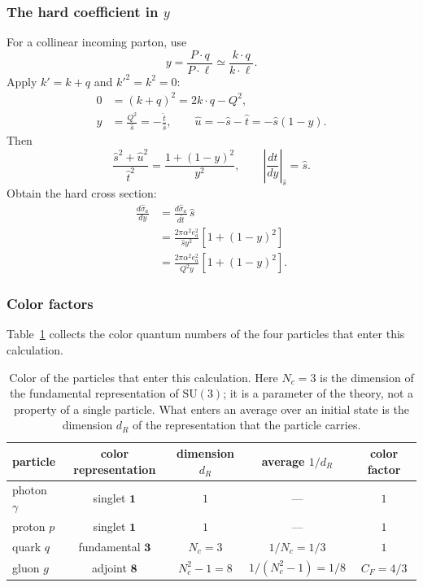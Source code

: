 \documentclass[14pt,a4paper]{extarticle}
\numberwithin{equation}{section}
\begin{document}
\subsubsection{The hard coefficient in \texorpdfstring{$y$}{y}}
For a collinear incoming parton, use
\begin{equation}
 y=\frac{P\cdot q}{P\cdot\ell}
 \simeq\frac{k\cdot q}{k\cdot\ell}.
\end{equation}
Apply $k'=k+q$ and $k'^2=k^2=0$:
\begin{align}
 0&=(k+q)^2=2k\cdot q-Q^2,\\
 y&=\frac{Q^2}{\hat s}=-\frac{\hat t}{\hat s},\qquad
 \hat u=-\hat s-\hat t=-\hat s(1-y).
 \label{eq:hard-y-relations}
\end{align}
Then
\begin{equation}
 \frac{\hat s^2+\hat u^2}{\hat t^2}
 =\frac{1+(1-y)^2}{y^2},\qquad
 \left|\frac{d\hat t}{dy}\right|_{\hat s}=\hat s.
\end{equation}
Obtain the hard cross section:
\begin{align}
 \frac{d\hat\sigma_a}{dy}
 &=\frac{d\hat\sigma_a}{d\hat t}\,\hat s\\
 &=\frac{2\pi\alpha^2e_a^2}{\hat s y^2}[1+(1-y)^2]\\
 &=\boxed{\frac{2\pi\alpha^2e_a^2}{Q^2y}[1+(1-y)^2]}.
 \label{eq:hard-dsigma-dy}
\end{align}

\subsubsection{Color factors}
Table~\ref{tab:color} collects the color quantum numbers of the four
particles that enter this calculation.

\begin{table}[H]
\centering
\vspace*{2mm}
\caption{Color of the particles that enter this calculation. Here $N_c=3$ is
the dimension of the fundamental representation of $\mathrm{SU}(3)$; it is a
parameter of the theory, not a property of a single particle. What enters an
average over an initial state is the dimension $d_R$ of the representation
that the particle carries.}
\label{tab:color}
\small
\begin{tabular}{@{}lcccc@{}}
\toprule
particle & color representation & dimension $d_R$
& average $1/d_R$ & color factor \\
\midrule
photon $\gamma$ & singlet $\mathbf 1$
  & $1$ & --- & $1$ \\
proton $p$ & singlet $\mathbf 1$
  & $1$ & --- & $1$ \\
quark $q$ & fundamental $\mathbf 3$
  & $N_c=3$ & $1/N_c=1/3$ & $1$ \\
gluon $g$ & adjoint $\mathbf 8$
  & $N_c^2-1=8$ & $1/(N_c^2-1)=1/8$ & $C_F=4/3$ \\
\bottomrule
\end{tabular}
\end{table}
\end{document}
